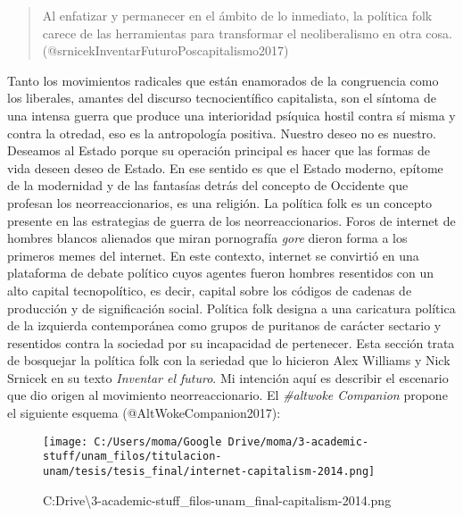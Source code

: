 \documentclass[
]{article}
\begin{document}
\begin{quote}
Al enfatizar y permanecer en el ámbito de lo inmediato, la política folk
carece de las herramientas para transformar el neoliberalismo en otra
cosa. (@srnicekInventarFuturoPoscapitalismo2017)
\end{quote}

Tanto los movimientos radicales que están enamorados de la congruencia
como los liberales, amantes del discurso tecnocientífico capitalista,
son el síntoma de una intensa guerra que produce una interioridad
psíquica hostil contra sí misma y contra la otredad, eso es la
antropología positiva. Nuestro deseo no es nuestro. Deseamos al Estado
porque su operación principal es hacer que las formas de vida deseen
deseo de Estado. En ese sentido es que el Estado moderno, epítome de la
modernidad y de las fantasías detrás del concepto de Occidente que
profesan los neorreaccionarios, es una religión. La política folk es un
concepto presente en las estrategias de guerra de los neorreaccionarios.
Foros de internet de hombres blancos alienados que miran pornografía
\emph{gore} dieron forma a los primeros memes del internet. En este
contexto, internet se convirtió en una plataforma de debate político
cuyos agentes fueron hombres resentidos con un alto capital
tecnopolítico, es decir, capital sobre los códigos de cadenas de
producción y de significación social. Política folk designa a una
caricatura política de la izquierda contemporánea como grupos de
puritanos de carácter sectario y resentidos contra la sociedad por su
incapacidad de pertenecer. Esta sección trata de bosquejar la política
folk con la seriedad que lo hicieron Alex Williams y Nick Srnicek en su
texto \emph{Inventar el futuro}. Mi intención aquí es describir el
escenario que dio origen al movimiento neorreaccionario. El
\emph{\#altwoke Companion} propone el siguiente esquema
(@AltWokeCompanion2017):

\begin{figure}
\centering
\texttt{[image: C:/Users/moma/Google Drive/moma/3-academic-stuff/unam\_filos/titulacion-unam/tesis/tesis\_final/internet-capitalism-2014.png]}
\caption{C:\Users\moma\Google Drive\moma\textbackslash3-academic-stuff\unam\_filos\titulacion-unam\tesis\tesis\_final\internet-capitalism-2014.png}
\end{figure}
\end{document}
